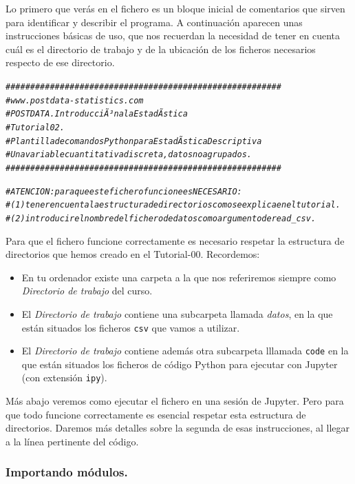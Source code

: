 \documentclass[10pt,a4paper]{article}\usepackage[]{graphicx}\usepackage[]{color}
\makeatletter
\newcommand{\hlcom}[1]{\textcolor[rgb]{0.678,0.584,0.686}{\textit{#1}}}%
\newenvironment{kframe}{%
 \def\at@end@of@kframe{}%
 \ifinner\ifhmode%
  \def\at@end@of@kframe{\end{minipage}}%
  \begin{minipage}{\columnwidth}%
 \fi\fi%
 \def\FrameCommand##1{\hskip\@totalleftmargin \hskip-\fboxsep
 \colorbox{shadecolor}{##1}\hskip-\fboxsep
     \hskip-\linewidth \hskip-\@totalleftmargin \hskip\columnwidth}%
 \MakeFramed {\advance\hsize-\width
   \@totalleftmargin\z@ \linewidth\hsize
   \@setminipage}}%
 {\par\unskip\endMakeFramed%
 \at@end@of@kframe}
\newenvironment{knitrout}{}{} %
\newcounter {cont01}
\makeatother
\begin{document}
Lo primero que verás en el fichero es un bloque inicial de comentarios que sirven para identificar y describir el programa. A continuación aparecen unas instrucciones básicas de uso, que nos recuerdan la necesidad de tener en cuenta cuál es el directorio de trabajo y de la ubicación de los ficheros necesarios respecto de ese directorio.
\begin{knitrout}
\color{fgcolor}\begin{kframe}
\begin{alltt}
\hlcom{########################################################}
\hlcom{# www.postdata-statistics.com}
\hlcom{# POSTDATA. IntroducciÃ³n a la EstadÃ­stica}
\hlcom{# Tutorial 02.  }
\hlcom{# Plantilla de comandos Python para EstadÃ­stica Descriptiva}
\hlcom{# Una variable cuantitativa discreta, datos no agrupados.}
\hlcom{########################################################}


\hlcom{# ATENCION: para que este fichero funcione es NECESARIO: }
\hlcom{# (1) tener en cuenta la estructura de directorios como se explica en el tutorial. }
\hlcom{# (2) introducir el nombre del fichero de datos como argumento de read_csv.}
\end{alltt}
\end{kframe}
\end{knitrout}
Para que el fichero funcione correctamente es necesario respetar la estructura de directorios que hemos creado en el Tutorial-00. Recordemos:
\begin{itemize}
\item En tu ordenador existe una carpeta a la que nos referiremos siempre como {\em Directorio de trabajo} del curso.
\item El {\em Directorio de trabajo} contiene una subcarpeta llamada {\em datos}, en la que están situados los ficheros {\tt csv} que vamos a utilizar.
\item El {\em Directorio de trabajo} contiene además otra subcarpeta lllamada {\tt code} en la que están situados los ficheros de código Python para ejecutar con Jupyter (con extensión {\tt ipy}).
\end{itemize}
Más abajo veremos como ejecutar el fichero en una sesión de Jupyter. Pero para que todo funcione correctamente es esencial respetar esta estructura de directorios. Daremos más detalles sobre la segunda de esas instrucciones, al llegar a la línea pertinente del código.

\subsubsection*{Importando módulos.}
\label{tut02:subsubsec:importandoModulos}
\end{document}
